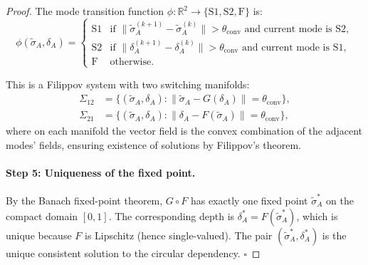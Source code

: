 \begin{proof}
The mode transition function $\phi: \mathbb{R}^2 \to \{\text{S1}, \text{S2}, \text{F}\}$ is:
\[
\phi(\tilde{\sigma}_A, \delta_A) = \begin{cases}
\text{S1} & \text{if } \|\tilde{\sigma}_A^{(k+1)} - \tilde{\sigma}_A^{(k)}\| > \theta_{\text{conv}}
\text{ and current mode is S2}, \\
\text{S2} & \text{if } \|\delta_A^{(k+1)} - \delta_A^{(k)}\| > \theta_{\text{conv}}
\text{ and current mode is S1}, \\
\text{F} & \text{otherwise}.
\end{cases}
\]

This is a Filippov system with two switching manifolds:
\begin{align*}
\Sigma_{12} &= \{(\tilde{\sigma}_A, \delta_A) : \|\tilde{\sigma}_A - G(\delta_A)\| = \theta_{\text{conv}}\}, \\
\Sigma_{21} &= \{(\tilde{\sigma}_A, \delta_A) : \|\delta_A - F(\tilde{\sigma}_A)\| = \theta_{\text{conv}}\},
\end{align*}
where on each manifold the vector field is the convex combination of
the adjacent modes' fields, ensuring existence of solutions by
Filippov's theorem.

\paragraph{Step 5: Uniqueness of the fixed point.}
By the Banach fixed-point theorem, $G \circ F$ has exactly one fixed
point $\tilde{\sigma}_A^*$ on the compact domain $[0, 1]$. The
corresponding depth is $\delta_A^* = F(\tilde{\sigma}_A^*)$, which is
unique because $F$ is Lipschitz (hence single-valued). The pair
$(\tilde{\sigma}_A^*, \delta_A^*)$ is the unique consistent solution
to the circular dependency. $\square$
\end{proof}

